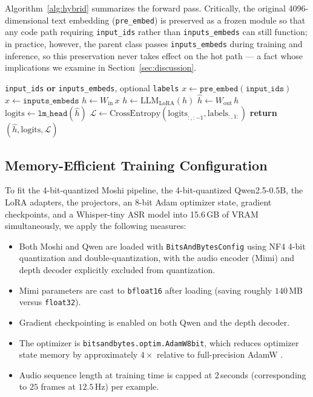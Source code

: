 \documentclass[conference]{IEEEtran}
\begin{document}
Algorithm~\ref{alg:hybrid} summarizes the forward pass. Critically, the original 4096-dimensional text embedding (\texttt{pre\_embed}) is preserved as a frozen module so that any code path requiring \texttt{input\_ids} rather than \texttt{inputs\_embeds} can still function; in practice, however, the parent class passes \texttt{inputs\_embeds} during training and inference, so this preservation never takes effect on the hot path --- a fact whose implications we examine in Section~\ref{sec:discussion}.

\begin{algorithm}[t]
\caption{HybridBackbone forward pass}
\label{alg:hybrid}
\begin{algorithmic}[1]
\REQUIRE \texttt{input\_ids} \textbf{or} \texttt{inputs\_embeds}, optional \texttt{labels}
    \STATE $x \leftarrow \texttt{pre\_embed}(\texttt{input\_ids})$ 
\ELSE
    \STATE $x \leftarrow \texttt{inputs\_embeds}$
\ENDIF
\STATE $h \leftarrow W_{\text{in}}\,x$ 
\STATE $h \leftarrow \text{LLM}_{\text{LoRA}}(h)$
\STATE $\hat{h} \leftarrow W_{\text{out}}\,h$ 
\STATE $\text{logits} \leftarrow \texttt{lm\_head}(\hat{h})$
    \STATE $\mathcal{L} \leftarrow \text{CrossEntropy}(\text{logits}_{:,:-1}, \text{labels}_{:,1:})$
\ENDIF
\STATE \textbf{return} $(\hat{h}, \text{logits}, \mathcal{L})$
\end{algorithmic}
\end{algorithm}

\subsection{Memory-Efficient Training Configuration}

To fit the 4-bit-quantized Moshi pipeline, the 4-bit-quantized Qwen2.5-0.5B, the LoRA adapters, the projectors, an 8-bit Adam optimizer state, gradient checkpoints, and a Whisper-tiny ASR model into 15.6\,GB of VRAM simultaneously, we apply the following measures:

\begin{itemize}
    \item Both Moshi and Qwen are loaded with \texttt{BitsAndBytesConfig} using NF4 4-bit quantization and double-quantization, with the audio encoder (Mimi) and depth decoder explicitly excluded from quantization.
    \item Mimi parameters are cast to \texttt{bfloat16} after loading (saving roughly $140$\,MB versus \texttt{float32}).
    \item Gradient checkpointing is enabled on both Qwen and the depth decoder.
    \item The optimizer is \texttt{bitsandbytes.optim.AdamW8bit}, which reduces optimizer state memory by approximately $4\times$ relative to full-precision AdamW \cite{adamw}.
    \item Audio sequence length at training time is capped at $2$\,seconds (corresponding to $25$ frames at $12.5$\,Hz) per example.
\end{itemize}
\end{document}
